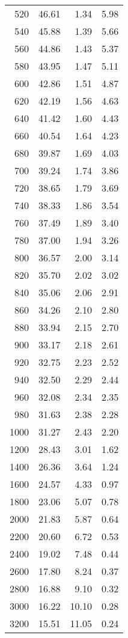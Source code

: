 \begin{table}[ht]
\begin{tabular}{rrrr}
    520 & 46.61 & 1.34 & 5.98 \\ 
    540 & 45.88 & 1.39 & 5.66 \\ 
    560 & 44.86 & 1.43 & 5.37 \\ 
    580 & 43.95 & 1.47 & 5.11 \\ 
    600 & 42.86 & 1.51 & 4.87 \\ 
    620 & 42.19 & 1.56 & 4.63 \\ 
    640 & 41.42 & 1.60 & 4.43 \\ 
    660 & 40.54 & 1.64 & 4.23 \\ 
    680 & 39.87 & 1.69 & 4.03 \\ 
    700 & 39.24 & 1.74 & 3.86 \\ 
    720 & 38.65 & 1.79 & 3.69 \\ 
    740 & 38.33 & 1.86 & 3.54 \\ 
    760 & 37.49 & 1.89 & 3.40 \\ 
    780 & 37.00 & 1.94 & 3.26 \\ 
    800 & 36.57 & 2.00 & 3.14 \\ 
    820 & 35.70 & 2.02 & 3.02 \\ 
    840 & 35.06 & 2.06 & 2.91 \\ 
    860 & 34.26 & 2.10 & 2.80 \\ 
    880 & 33.94 & 2.15 & 2.70 \\ 
    900 & 33.17 & 2.18 & 2.61 \\ 
    920 & 32.75 & 2.23 & 2.52 \\ 
    940 & 32.50 & 2.29 & 2.44 \\ 
    960 & 32.08 & 2.34 & 2.35 \\ 
    980 & 31.63 & 2.38 & 2.28 \\ 
   1000 & 31.27 & 2.43 & 2.20 \\ 
   1200 & 28.43 & 3.01 & 1.62 \\ 
   1400 & 26.36 & 3.64 & 1.24 \\ 
   1600 & 24.57 & 4.33 & 0.97 \\ 
   1800 & 23.06 & 5.07 & 0.78 \\ 
   2000 & 21.83 & 5.87 & 0.64 \\ 
   2200 & 20.60 & 6.72 & 0.53 \\ 
   2400 & 19.02 & 7.48 & 0.44 \\ 
   2600 & 17.80 & 8.24 & 0.37 \\ 
   2800 & 16.88 & 9.10 & 0.32 \\ 
   3000 & 16.22 & 10.10 & 0.28 \\ 
   3200 & 15.51 & 11.05 & 0.24 \\ 

\end{tabular}
\end{table}
